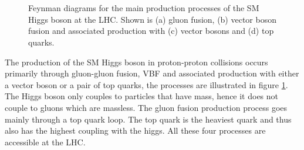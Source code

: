 \begin{figure}[!htb]
 \qquad
{} \\
  \qquad
{} \\
\caption[Feynman diagrams for the main production processes of the SM Higgs boson at the LHC.]
{Feynman diagrams for the main production processes of the \gls{SM} Higgs boson at the \gls{LHC}. Shown is (a) gluon fusion, (b) vector boson fusion and associated production with (c) vector bosons and (d) top quarks.}
\label{FIGURE:Theory_SM_SearchingSMHiggs_SMFeynmanDiagrams}
\end{figure}

The production of the \gls{SM} Higgs boson in proton-proton collisions occurs primarily through gluon-gluon fusion, \gls{VBF} and associated production with either a vector boson or a pair of top quarks, the processes are illustrated in figure \ref{FIGURE:Theory_SM_SearchingSMHiggs_SMFeynmanDiagrams}. The Higgs boson only couples to particles that have mass, hence it does not couple to gluons which are massless. The gluon fusion production process goes mainly through a top quark loop. The top quark is the heaviest quark and thus also has the highest coupling with the higgs. All these four processes are accessible at the \gls{LHC}.

